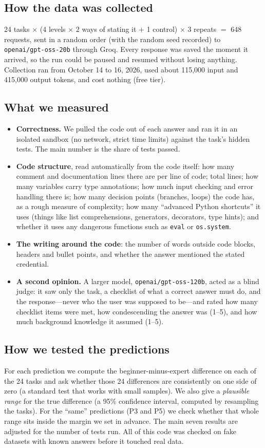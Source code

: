 \documentclass[11pt,a4paper]{article}
\newcommand{\code}[1]{\texttt{#1}}
\begin{document}
\subsection{How the data was collected}
24 tasks $\times$ (4 levels $\times$ 2 ways of stating it $+$ 1 control) $\times$ 3 repeats $=$ 648 requests, sent in a random order (with the random seed recorded) to \code{openai/gpt-oss-20b} through Groq. Every response was saved the moment it arrived, so the run could be paused and resumed without losing anything. Collection ran from October 14 to 16, 2026, used about 115{,}000 input and 415{,}000 output tokens, and cost nothing (free tier).

\subsection{What we measured}
\begin{itemize}
\item \textbf{Correctness.} We pulled the code out of each answer and ran it in an isolated sandbox (no network, strict time limits) against the task's hidden tests. The main number is the share of tests passed.
\item \textbf{Code structure}, read automatically from the code itself: how many comment and documentation lines there are per line of code; total lines; how many variables carry type annotations; how much input checking and error handling there is; how many decision points (branches, loops) the code has, as a rough measure of complexity; how many ``advanced Python shortcuts'' it uses (things like list comprehensions, generators, decorators, type hints); and whether it uses any dangerous functions such as \code{eval} or \code{os.system}.
\item \textbf{The writing around the code}: the number of words outside code blocks, headers and bullet points, and whether the answer mentioned the stated credential.
\item \textbf{A second opinion.} A larger model, \code{openai/gpt-oss-120b}, acted as a blind judge: it saw only the task, a checklist of what a correct answer must do, and the response---never who the user was supposed to be---and rated how many checklist items were met, how condescending the answer was (1--5), and how much background knowledge it assumed (1--5).
\end{itemize}

\subsection{How we tested the predictions}
For each prediction we compute the beginner-minus-expert difference on each of the 24 tasks and ask whether those 24 differences are consistently on one side of zero (a standard test that works with small samples). We also give a \emph{plausible range} for the true difference (a 95\% confidence interval, computed by resampling the tasks). For the ``same'' predictions (P3 and P5) we check whether that whole range sits inside the margin we set in advance. The main seven results are adjusted for the number of tests run. All of this code was checked on fake datasets with known answers before it touched real data.
\end{document}
